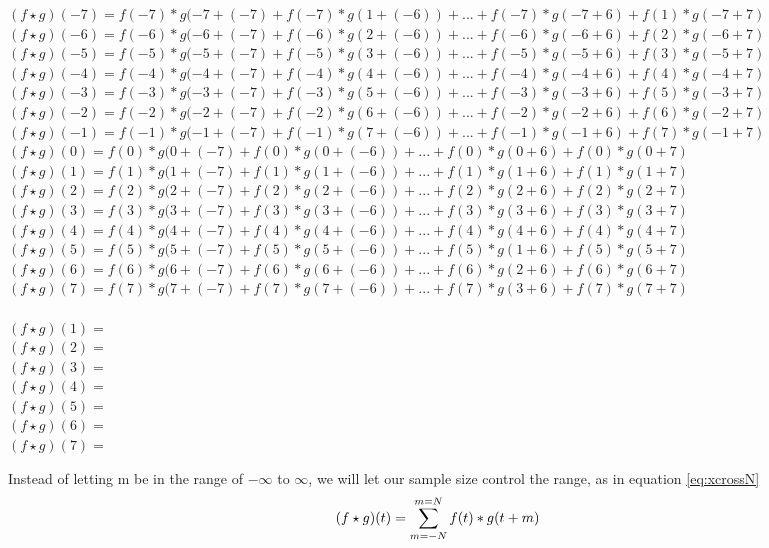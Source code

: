 \begin{center}
$(f\star g)(-7)=f(-7)*g(-7+(-7)+f(-7)*g(1+(-6))+...+f(-7)*g(-7+6)+f(1)*g(-7+7)$\\
$(f\star g)(-6)=f(-6)*g(-6+(-7)+f(-6)*g(2+(-6))+...+f(-6)*g(-6+6)+f(2)*g(-6+7)$\\
$(f\star g)(-5)=f(-5)*g(-5+(-7)+f(-5)*g(3+(-6))+...+f(-5)*g(-5+6)+f(3)*g(-5+7)$\\
$(f\star g)(-4)=f(-4)*g(-4+(-7)+f(-4)*g(4+(-6))+...+f(-4)*g(-4+6)+f(4)*g(-4+7)$\\
$(f\star g)(-3)=f(-3)*g(-3+(-7)+f(-3)*g(5+(-6))+...+f(-3)*g(-3+6)+f(5)*g(-3+7)$\\
$(f\star g)(-2)=f(-2)*g(-2+(-7)+f(-2)*g(6+(-6))+...+f(-2)*g(-2+6)+f(6)*g(-2+7)$\\
$(f\star g)(-1)=f(-1)*g(-1+(-7)+f(-1)*g(7+(-6))+...+f(-1)*g(-1+6)+f(7)*g(-1+7)$\\
$(f\star g)(0)=f(0)*g(0+(-7)+f(0)*g(0+(-6))+...+f(0)*g(0+6)+f(0)*g(0+7)$\\
$(f\star g)(1)=f(1)*g(1+(-7)+f(1)*g(1+(-6))+...+f(1)*g(1+6)+f(1)*g(1+7)$\\
$(f\star g)(2)=f(2)*g(2+(-7)+f(2)*g(2+(-6))+...+f(2)*g(2+6)+f(2)*g(2+7)$\\
$(f\star g)(3)=f(3)*g(3+(-7)+f(3)*g(3+(-6))+...+f(3)*g(3+6)+f(3)*g(3+7)$\\
$(f\star g)(4)=f(4)*g(4+(-7)+f(4)*g(4+(-6))+...+f(4)*g(4+6)+f(4)*g(4+7)$\\
$(f\star g)(5)=f(5)*g(5+(-7)+f(5)*g(5+(-6))+...+f(5)*g(1+6)+f(5)*g(5+7)$\\
$(f\star g)(6)=f(6)*g(6+(-7)+f(6)*g(6+(-6))+...+f(6)*g(2+6)+f(6)*g(6+7)$\\
$(f\star g)(7)=f(7)*g(7+(-7)+f(7)*g(7+(-6))+...+f(7)*g(3+6)+f(7)*g(7+7)$\\
\ \\
$(f\star g)(1)=$\\
$(f\star g)(2)=$\\
$(f\star g)(3)=$\\
$(f\star g)(4)=$\\
$(f\star g)(5)=$\\
$(f\star g)(6)=$\\
$(f\star g)(7)=$\\
\end{center}

Instead of letting m be in the range of $-\infty$ to $\infty$, we will let our sample size control the range, as in equation \ref{eq:xcrossN}
\begin{equation}
\label{eq:xcrossN}
\centering
(f\star g)(t)=\sum\limits_{m=-N}^{m=N}f(t)*g(t+m)
\end{equation}


